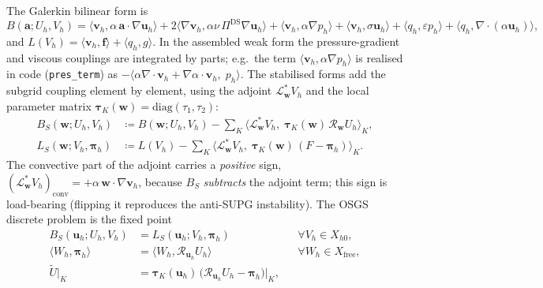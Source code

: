 \documentclass{article}
\newcommand{\code}[1]{\texttt{\small #1}}
\begin{document}
The Galerkin bilinear form is
\begin{equation}
    \label{eq:alg-galerkin}
    B(\boldsymbol{a}; U_h, V_h)
        = \langle \boldsymbol{v}_h, \alpha\,\boldsymbol{a}\!\cdot\!\nabla\boldsymbol{u}_h\rangle
        + 2\langle \nabla\boldsymbol{v}_h, \alpha\nu\,\Pi^{\mathrm{DS}}\nabla\boldsymbol{u}_h\rangle
        + \langle \boldsymbol{v}_h, \alpha\nabla p_h\rangle
        + \langle \boldsymbol{v}_h, \sigma\boldsymbol{u}_h\rangle
        + \langle q_h, \varepsilon p_h\rangle
        + \langle q_h, \nabla\!\cdot\!(\alpha\boldsymbol{u}_h)\rangle ,
\end{equation}
and $L(V_h) = \langle\boldsymbol{v}_h,\boldsymbol{f}\rangle + \langle q_h, g\rangle$. In the
assembled weak form the pressure-gradient and viscous couplings are integrated
by parts; e.g.\ the term $\langle\boldsymbol{v}_h,\alpha\nabla p_h\rangle$ is
realised in code (\code{pres\_term}) as
$-\langle\alpha\nabla\!\cdot\!\boldsymbol{v}_h + \nabla\alpha\!\cdot\!\boldsymbol{v}_h,\; p_h\rangle$.
The stabilised forms add the subgrid coupling element by element, using
the adjoint $\mathcal{L}^{*}_{\boldsymbol{w}}V_h$ and the local parameter
matrix $\boldsymbol{\tau}_K(\boldsymbol{w}) = \mathrm{diag}(\tau_1,\tau_2)$:
\begin{align}
    \label{eq:alg-BS}
    B_S(\boldsymbol{w}; U_h, V_h)
        &\coloneqq B(\boldsymbol{w}; U_h, V_h)
        - \sum_K \bigl\langle \mathcal{L}^{*}_{\boldsymbol{w}}V_h,\;
            \boldsymbol{\tau}_K(\boldsymbol{w})\,\mathcal{R}_{\boldsymbol{w}} U_h \bigr\rangle_K , \\
    \label{eq:alg-LS}
    L_S(\boldsymbol{w}; V_h, \boldsymbol{\pi}_h)
        &\coloneqq L(V_h)
        - \sum_K \bigl\langle \mathcal{L}^{*}_{\boldsymbol{w}}V_h,\;
            \boldsymbol{\tau}_K(\boldsymbol{w})\,(F - \boldsymbol{\pi}_h) \bigr\rangle_K .
\end{align}
The convective part of the adjoint carries a \emph{positive} sign,
$(\mathcal{L}^{*}_{\boldsymbol{w}}V_h)_{\mathrm{conv}} = +\alpha\,\boldsymbol{w}\!\cdot\!\nabla\boldsymbol{v}_h$,
because $B_S$ \emph{subtracts} the adjoint term; this sign is load-bearing
(flipping it reproduces the anti-SUPG instability). The OSGS discrete
problem is the fixed point
\begin{subequations}
\label{eq:alg-osgs-problem}
\begin{align}
    \label{eq:alg-osgs-B}
    B_S(\boldsymbol{u}_h; U_h, V_h)
        &= L_S(\boldsymbol{u}_h; V_h, \boldsymbol{\pi}_h)
        && \forall V_h \in X_{h0}, \\
    \label{eq:alg-osgs-proj}
    \langle W_h, \boldsymbol{\pi}_h\rangle
        &= \langle W_h, \mathcal{R}_{\boldsymbol{u}_h} U_h\rangle
        && \forall W_h \in X_{\mathrm{free}}, \\
    \label{eq:alg-osgs-subscale}
    \widetilde{U}\big|_K
        &= \boldsymbol{\tau}_K(\boldsymbol{u}_h)\,
            \bigl(\mathcal{R}_{\boldsymbol{u}_h} U_h - \boldsymbol{\pi}_h\bigr)\big|_K ,
\end{align}
\end{subequations}
\end{document}

